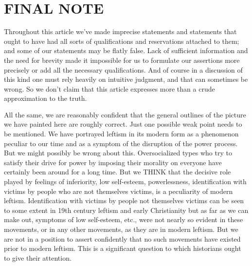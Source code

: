 \chapter{FINAL NOTE}

 Throughout this article we’ve made imprecise statements and statements that ought to have had all sorts of qualifications and reservations attached to them; and some of our statements may be flatly false. Lack of sufficient information and the need for brevity made it impossible for us to formulate our assertions more precisely or add all the necessary qualifications. And of course in a discussion of this kind one must rely heavily on intuitive judgment, and that can sometimes be wrong. So we don’t claim that this article expresses more than a crude approximation to the truth.

 All the same, we are reasonably confident that the general outlines of the picture we have painted here are roughly correct. Just one possible weak point needs to be mentioned. We have portrayed leftism in its modern form as a phenomenon peculiar to our time and as a symptom of the disruption of the power process. But we might possibly be wrong about this. Oversocialized types who try to satisfy their drive for power by imposing their morality on everyone have certainly been around for a long time. But we THINK that the decisive role played by feelings of inferiority, low self-esteem, powerlessness, identification with victims by people who are not themselves victims, is a peculiarity of modern leftism. Identification with victims by people not themselves victims can be seen to some extent in 19th century leftism and early Christianity but as far as we can make out, symptoms of low self-esteem, etc., were not nearly so evident in these movements, or in any other movements, as they are in modern leftism. But we are not in a position to assert confidently that no such movements have existed prior to modern leftism. This is a significant question to which historians ought to give their attention.
